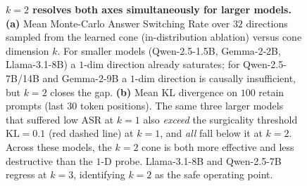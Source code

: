 \begin{figure}[t]






\caption{%
\textbf{$k=2$ resolves both axes simultaneously for larger models.}
\textbf{(a)} Mean Monte-Carlo Answer Switching Rate over $32$ directions sampled
from the learned cone (in-distribution ablation) versus cone dimension $k$.
For smaller models (Qwen-2.5-1.5B, Gemma-2-2B, Llama-3.1-8B) a $1$-dim direction
already saturates; for Qwen-2.5-7B/14B and Gemma-2-9B a $1$-dim direction is
causally insufficient, but $k{=}2$ closes the gap.
\textbf{(b)} Mean KL divergence on $100$ retain prompts (last $30$ token
positions). The same three larger models that suffered low ASR at $k{=}1$ also
\emph{exceed} the surgicality threshold $\mathrm{KL}=0.1$ (red dashed line) at
$k{=}1$, and \emph{all} fall below it at $k{=}2$. Across these models, the
$k{=}2$ cone is both more effective and less destructive than the $1$-D probe.
Llama-3.1-8B and
Qwen-2.5-7B regress at $k{=}3$, identifying $k{=}2$ as the safe operating point.
}
\label{fig:teaser}
\end{figure}
